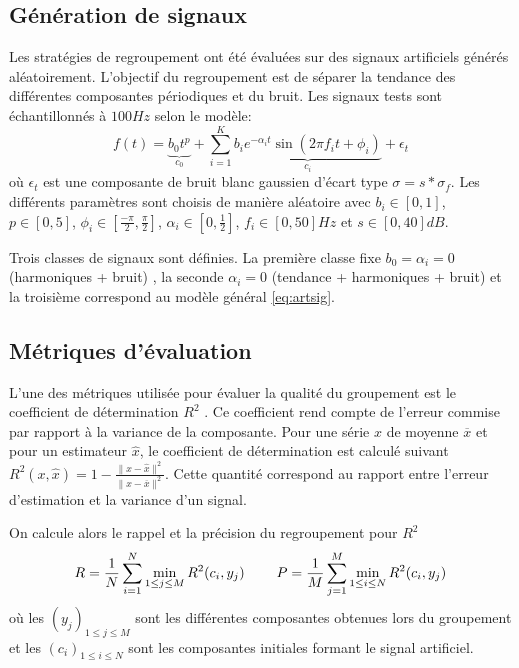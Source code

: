 \documentclass{gretsi}
\newcommand{\inter}{\left[0, 1\right]}
\begin{document}
\subsection{Génération de signaux}
\label{sub:artsig}
    Les stratégies de regroupement ont été évaluées sur des signaux artificiels générés aléatoirement.
    L'objectif du regroupement est de séparer la tendance des différentes composantes périodiques et du bruit. Les signaux tests sont échantillonnés à $100Hz$ selon le modèle:
    \begin{equation}\label{eq:artsig}
    f(t) = \underbrace{b_0 t^p}_{c_0} + \sum_{i=1}^K \underbrace{b_i e^{-\alpha_i t} \sin\left(2\pi f_i t + \phi_i\right)}_{c_i} + \epsilon_t
    \end{equation}
    où $\epsilon_t$  est une composante de bruit blanc gaussien d'écart type $\sigma = s*\sigma_f$.
    Les différents paramètres sont choisis de manière aléatoire avec $b_i \in \inter$, $p \in \left[0, 5\right]$, $\displaystyle \phi_i \in\left[\frac{-\pi}{2}, \frac{\pi}{2}\right]$, $\alpha_i \in \left[0, \frac{1}{2}\right]$, $f_i \in \left[0, 50\right]Hz$ et $s \in \left[0, 40\right]dB$.
   

    Trois classes de signaux sont définies.
    La première classe fixe $b_0 = \alpha_i = 0$ (harmoniques + bruit) , la seconde $\alpha_i = 0$ (tendance + harmoniques + bruit) et la troisième correspond au modèle général \eqref{eq:artsig}.



\subsection{Métriques d'évaluation}
\label{sub:met}

    L'une des métriques utilisée pour évaluer la qualité du groupement est le coefficient de détermination $R^2$ \cite{abalov_14_auto}.
    Ce coefficient rend compte de l'erreur commise par rapport à la variance de la composante.
    Pour une série $x$ de moyenne $\overline x$ et pour un estimateur $\widehat x$, le coefficient de détermination est calculé suivant $R^2(x, \widehat x) = 1 - \frac{\|x-\widehat x\|^2}{\|x-\overline x\|^2}$.
    Cette quantité correspond au rapport entre l'erreur d'estimation et la variance d'un signal.

    On calcule alors le rappel et la précision du regroupement pour $R^2$
    \begin{equation}
        R = \frac{1}{N} \sum_{i=1}^N \min_{1\le j\le M} R^2(c_i, y_j) \hspace{0.8cm} P = \frac{1}{M}\sum_{j=1}^M \min_{1\le i\le N} R^2(c_i, y_j)
    \end{equation}
    où les $( y_j)_{1\le j \le M}$ sont les différentes composantes obtenues lors du groupement et les $(c_i)_{1\le i\le N}$ sont les composantes initiales formant le signal artificiel.
    
\end{document}
